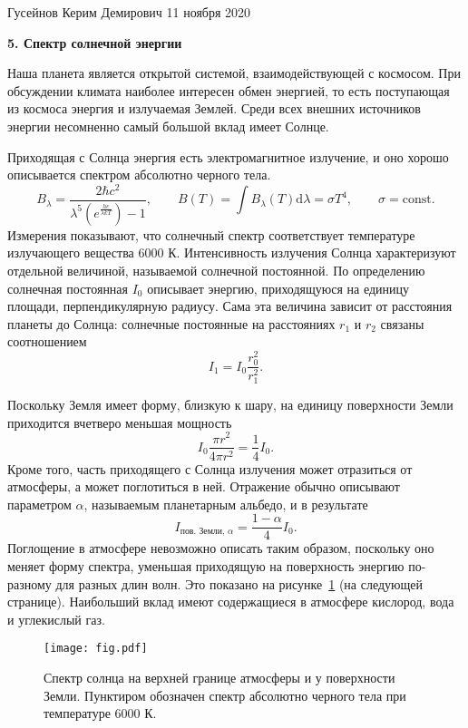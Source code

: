 \documentclass[a4paper, 12pt]{article}
\begin{document}
\noindent
Гусейнов Керим Демирович
\hfill
11 ноября 2020

\begin{center}
	\textbf{5. Спектр солнечной энергии}
\end{center}

Наша планета является открытой системой, взаимодействующей с космосом. При обсуждении климата наиболее интересен обмен энергией, то есть поступающая из космоса энергия и излучаемая Землей. Среди всех внешних источников энергии несомненно самый большой вклад имеет Солнце.

Приходящая с Солнца энергия есть электромагнитное излучение, и оно хорошо описывается спектром абсолютно черного тела.
$$ B_\lambda = \frac{2\hbar c^2}{\lambda^5 \left(e^{\frac{hc}{\lambda kT}}\right) - 1},
\qquad
B(T) = \int B_\lambda(T) \mathrm{d}\lambda = \sigma T^4,
\qquad
\sigma = \mathrm{const}.
$$
Измерения показывают, что солнечный спектр соответствует температуре излучающего вещества 6000 К. Интенсивность излучения Солнца характеризуют отдельной величиной, называемой солнечной постоянной. По определению солнечная постоянная $I_0$ описывает энергию, приходящуюся на единицу площади, перпендикулярную радиусу. Сама эта величина зависит от расстояния планеты до Солнца: солнечные постоянные на расстояниях $r_1$ и $r_2$ связаны соотношением
$$I_1 = I_0 \frac{r_0^2}{r_1^2}.$$

Поскольку Земля имеет форму, близкую к шару, на единицу поверхности Земли приходится вчетверо меньшая мощность
$$ I_0 \frac{\pi r ^ 2}{4 \pi r ^2} = \frac{1}{4} I_0. $$
Кроме того, часть приходящего с Солнца излучения может отразиться от атмосферы, а может поглотиться в ней. Отражение обычно описывают параметром $\alpha$, называемым планетарным альбедо, и в результате
$$I_{\text{пов. Земли, }\alpha} = \frac{1 - \alpha}{4} I_0.$$
Поглощение в атмосфере невозможно описать таким образом, поскольку оно меняет форму спектра, уменьшая приходящую на поверхность энергию по-разному для разных длин волн. Это показано на рисунке~\ref{fig1} (на следующей странице). Наибольший вклад имеют содержащиеся в атмосфере кислород, вода и углекислый газ.

\begin{figure}[b!]
	\texttt{[image: fig.pdf]}
	\caption{Спектр солнца на верхней границе атмосферы и у поверхности Земли. Пунктиром обозначен спектр абсолютно черного тела при температуре 6000 К.}
	\label{fig1}
\end{figure}
\end{document}
